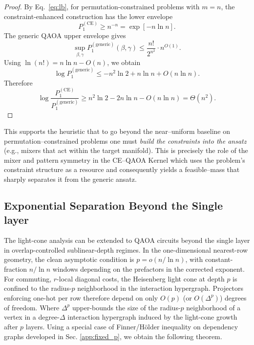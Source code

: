 \documentclass[a4paper,onecolumn,11pt,unpublished]{quantumarticle}
\theoremstyle{remark}
\begin{document}
\begin{proof}
By Eq.~\eqref{eq:lb}, for permutation-constrained problems with \(m=n\), the
constraint-enhanced construction has the lower envelope
\[
  P_{1}^{\mathrm{(CE)}}\ge n^{-n}=\exp[-n\ln n].
\]
The generic QAOA upper envelope gives
\[
  \sup_{\beta,\gamma}P_{1}^{\mathrm{(generic)}}(\beta,\gamma)
  \le
  \frac{n!}{2^{n^2}}\cdot n^{O(1)}.
\]
Using \(\ln(n!)=n\ln n-O(n)\), we obtain
\[
  \log P_{1}^{\mathrm{(generic)}}
  \le
  -n^2\ln 2+n\ln n+O(n\ln n).
\]
Therefore
\[
  \log\frac{P_{1}^{\mathrm{(CE)}}}{P_{1}^{\mathrm{(generic)}}}
  \ge
  n^2\ln 2-2n\ln n-O(n\ln n)
  =
  \Theta(n^2).
\]
\end{proof}




\noindent
This supports the heuristic that to go beyond the near–uniform baseline on permutation–constrained problems one must \emph{build the constraints into the ansatz} (e.g., mixers that act within the target manifold). This is precisely the role of the mixer and pattern symmetry in the CE–QAOA Kernel which uses the problem's constraint structure as a resource and consequently yields a feasible–mass that sharply separates it from the generic ansatz.  



\subsection{Exponential Separation Beyond the Single layer}


The light-cone analysis can be extended to QAOA circuits beyond the single
layer in overlap-controlled sublinear-depth regimes.  In the one-dimensional
nearest-row geometry, the clean asymptotic condition is
\(p=o(n/\ln n)\), with constant-fraction \(n/\ln n\) windows depending on
the prefactors in the corrected exponent. For commuting, \(r\)-local diagonal costs, the Heisenberg light cone at depth \(p\) is confined to the radius-\(p\) neighborhood in the interaction hypergraph.  Projectors enforcing one-hot per row therefore depend on only \(O(p)\) (or \(O(\Delta^{p})\)) degrees of freedom. Where $\Delta^{p}$ upper-bounds the size of the radius-$p$ neighborhood of a vertex in a degree-$\Delta$ interaction hypergraph induced by the light-cone growth after $p$ layers. Using a special case of Finner/Hölder inequality on dependency graphs\cite{Finner1992} developed in Sec. \ref{app:fixed_p}, we obtain the following theorem.
\end{document}
